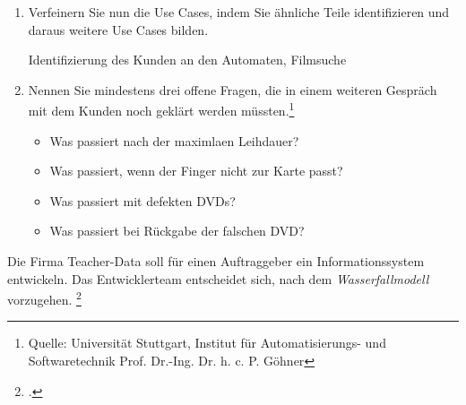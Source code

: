 \documentclass{bschlangaul-aufgabe}
\begin{document}
\begin{enumerate}

\item Verfeinern Sie nun die Use Cases, indem Sie ähnliche Teile
identifizieren und daraus weitere Use Cases bilden.

\begin{bAntwort}
Identifizierung des Kunden an den Automaten, Filmsuche
\end{bAntwort}


\item Nennen Sie mindestens drei offene Fragen, die in einem weiteren
Gespräch mit dem Kunden noch geklärt werden müssten.\footnote{Quelle:
Universität Stuttgart, Institut für Automatisierungs- und
Softwaretechnik Prof. Dr.-Ing. Dr. h. c. P. Göhner}

\begin{bAntwort}
\begin{itemize}
\item Was passiert nach der maximlaen Leihdauer?
\item Was passiert, wenn der Finger nicht zur Karte passt?
\item Was passiert mit defekten DVDs?
\item Was passiert bei Rückgabe der falschen DVD?
\end{itemize}
\end{bAntwort}
\end{enumerate}

%


Die Firma Teacher-Data soll für einen Auftraggeber ein
Informationssystem entwickeln. Das Entwicklerteam entscheidet sich, nach
dem \emph{Wasserfallmodell} vorzugehen.
\footcite[Aufgabe 1]{sosy:ab:1}
\end{document}
